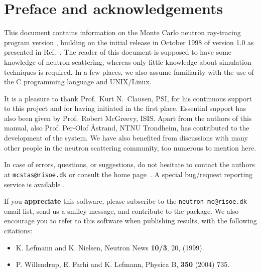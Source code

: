 
\chapter*{Preface and acknowledgements}
This document contains information on the Monte Carlo neutron
ray-tracing program \MCS version \version, building on the initial
release in October 1998 of version 1.0 as presented in Ref.~\cite{nn_10_20}. The reader of this
document is supposed to have some knowledge of neutron scattering,
whereas only little knowledge about simulation techniques is
required. In a few places, we also assume familiarity with the
use of the C programming language and UNIX/Linux.

It is a pleasure to thank Prof.~Kurt N.~Clausen, PSI, for his continuous
support to this project and for having initiated \MCS in the first
place. Essential support has also been given by Prof.~Robert McGreevy, ISIS.
Apart from the authors of this manual, also Prof. Per-Olof \AA strand, NTNU Trondheim,
has contributed to the development of the \MCS system.
We have also benefited
from discussions with many other people in the neutron scattering
community, too numerous to mention here.


In case of errors, questions, or suggestions, do not hesitate to
contact the authors at \verb+mcstas@risoe.dk+
or consult the \MCS home page~\cite{mcstas_webpage}.
A special bug/request reporting service is available \cite{mczilla_webpage}.

If you {\bf appreciate} this software, please subscribe to the \verb+neutron-mc@risoe.dk+ email list, send us a smiley message, and contribute to the package. We also encourage you to refer to this software when publishing results, with the following citations:
\begin{itemize}
\item{K. Lefmann and K. Nielsen, Neutron News {\bf 10/3}, 20, (1999).}
\item{P. Willendrup, E. Farhi and K. Lefmann, Physica B, {\bf 350} (2004) 735.}
\end{itemize}


